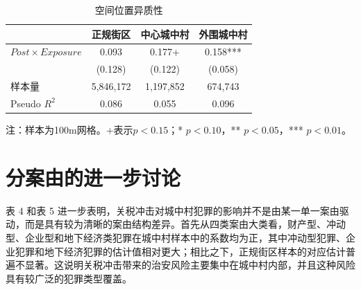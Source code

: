 \documentclass[a4paper,12pt]{report}
\begin{document}
\begin{table}[H]
\centering
\caption{空间位置异质性}
\label{tab:hetero_core_peri}
\begin{tabular*}{\textwidth}{@{\extracolsep{\fill}}lccc}
\toprule
 & 正规街区 & 中心城中村 & 外围城中村 \\
\midrule
$Post\times Exposure$ & 0.093 & 0.177+ & 0.158*** \\
 & (0.128) & (0.122) & (0.058) \\
\midrule
样本量 & 5,846,172 & 1,197,852 & 674,743 \\
Pseudo $R^2$ & 0.086 & 0.055 & 0.096 \\
\bottomrule
\end{tabular*}
\vspace{0.2cm}

\par\raggedright{} 注：样本为100m网格。$+$表示$p<0.15$；* $p<0.10$，** $p<0.05$，*** $p<0.01$。
\end{table}



\section{分案由的进一步讨论}
表 4 和表 5 进一步表明，关税冲击对城中村犯罪的影响并不是由某一单一案由驱动，而是具有较为清晰的案由结构差异。首先从四类案由大类看，财产型、冲动型、企业型和地下经济类犯罪在城中村样本中的系数均为正，其中冲动型犯罪、企业犯罪和地下经济犯罪的估计值相对更大；相比之下，正规街区样本的对应估计普遍不显著。这说明关税冲击带来的治安风险主要集中在城中村内部，并且这种风险具有较广泛的犯罪类型覆盖。
\end{document}
